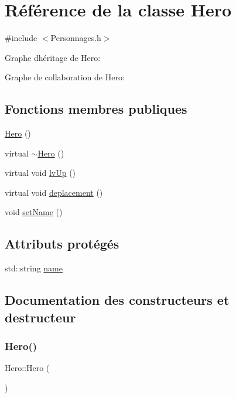 \hypertarget{classHero}{}\section{Référence de la classe Hero}
\label{classHero}


{\ttfamily \#include $<$Personnages.\+h$>$}



Graphe d\textquotesingle{}héritage de Hero\+:


Graphe de collaboration de Hero\+:
\subsection*{Fonctions membres publiques}
\begin{DoxyCompactItemize}
\item 
\hyperlink{classHero_ab5920677a4b5cb59d6f513922d037dca}{Hero} ()
\item 
virtual \hyperlink{classHero_afe27b3ed103640330e911197d95d7c18}{$\sim$\+Hero} ()
\item 
virtual void \hyperlink{classHero_af49c7f895ca52c04d8a9c7bd7fae96b5}{lv\+Up} ()
\item 
virtual void \hyperlink{classHero_a0429397b47b0d3969c4e30cc5bdee250}{deplacement} ()
\item 
void \hyperlink{classHero_a9759e2cbd4c041ae1aa69c3e6f06b826}{set\+Name} ()
\end{DoxyCompactItemize}
\subsection*{Attributs protégés}
\begin{DoxyCompactItemize}
\item 
std\+::string \hyperlink{classHero_a26989c93944866e4f3b9c60cc8f47e0a}{name}
\end{DoxyCompactItemize}


\subsection{Documentation des constructeurs et destructeur}
\mbox{\label{classHero_ab5920677a4b5cb59d6f513922d037dca}} 
\subsubsection{\texorpdfstring{Hero()}{Hero()}}
{\footnotesize\ttfamily Hero\+::\+Hero (\begin{DoxyParamCaption}{ }\end{DoxyParamCaption})}

